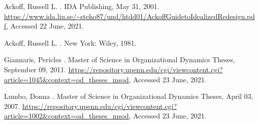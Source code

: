 \documentclass[
a4paper,
12pt
]{scrartcl}
\begin{document}
	
	
	
	\newpage
	
	
	\begin{thebibliography}{xxx}
		
		  Ackoff, Russell L.
		.  
		\newblock IDA Publishing, May 31, 2001.
		\newblock \url{https://www.ida.liu.se/~steho87/und/htdd01/AckoffGuidetoIdealizedRedesign.pdf},
		\newblock Accessed 22 June, 2021.
		
		  Ackoff, Russell L.
		.
		\newblock New York:	Wiley, 1981.
		
		  Giannaris, Pericles
		.
		\newblock Master of Science in Organizational Dynamics Theses, September 09, 2011.
		\newblock \url{https://repository.upenn.edu/cgi/viewcontent.cgi?article=1045&context=od_theses_msod},
		\newblock Accessed 23 June, 2021.
		
		  Lumbo, Donna
		.
		\newblock Master of Science in Organizational Dynamics Theses, April 03, 2007.
		\newblock \url{https://repository.upenn.edu/cgi/viewcontent.cgi?article=1002&context=od_theses_msod},
		\newblock Accessed 23 June, 2021.
	
	\end{thebibliography}

	
\end{document}
